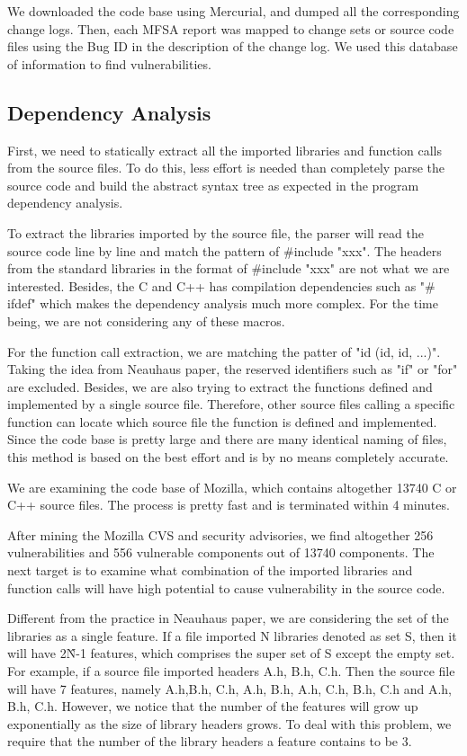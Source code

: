 \documentclass{acm_proc_article-sp}
\begin{document}
We downloaded the code base using Mercurial, and dumped all the corresponding 
change logs. Then, each MFSA report was mapped to change sets or source code 
files using the Bug ID in the description of the change log. We used this 
database of information to find vulnerabilities. 

\subsection{Dependency Analysis}
First, we need to statically extract all the imported libraries and function 
calls from the source files. To do this, less effort is needed than completely 
parse the source code and build the abstract syntax tree as expected in the 
program dependency analysis.

To extract the libraries imported by the source file, the parser will read the 
source code line by line and match the pattern of \#include "xxx". The headers 
from the standard libraries in the format of \#include "xxx" are not what we 
are interested. Besides, the C and C++ has compilation dependencies such as "\#
ifdef" which makes the dependency analysis much more complex. For the time 
being, we are not considering any of these macros.

For the function call extraction, we are matching the patter of "id (id, id, 
...)". Taking the idea from Neauhaus paper, the reserved identifiers such as 
"if" or "for" are excluded. Besides, we are also trying to extract the 
functions defined and implemented by a single source file. Therefore, other 
source files calling a specific function can locate which source file the 
function is defined and implemented. Since the code base is pretty large and 
there are many identical naming of files, this method is based on the best 
effort and is by no means completely accurate.

We are examining the code base of Mozilla, which contains altogether 13740 C or 
C++ source files. The process is pretty fast and is terminated within 4 minutes.

After mining the Mozilla CVS and security advisories, we find altogether 256 
vulnerabilities and 556 vulnerable components out of 13740 components. The next 
target is to examine what combination of the imported libraries and function 
calls will have high potential to cause vulnerability in the source code.

Different from the practice in Neauhaus paper, we are considering the set of 
the libraries as a single feature. If a file imported N libraries denoted as 
set S, then it will have 2\^N-1 features, which comprises the super set of S 
except the empty set. For example, if a source file imported headers A.h, B.h, 
C.h. Then the source file will have 7 features, namely {A.h},{B.h}, {C.h}, 
{A.h, B.h}, {A.h, C.h}, {B.h, C.h} and {A.h, B.h, C.h}. However, we notice that 
the number of the features will grow up exponentially as the size of library 
headers grows. To deal with this problem, we require that the number of the 
library headers a feature contains to be 3.
\end{document}
